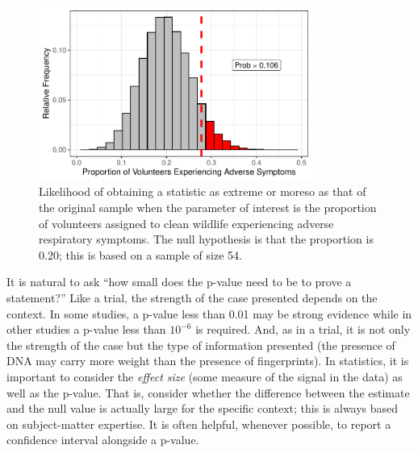 \documentclass[
  letterpaper,
  DIV=11,
  numbers=noendperiod]{scrreprt}
\theoremstyle{plain}
\theoremstyle{definition}
\theoremstyle{definition}
\theoremstyle{remark}
\begin{document}
\begin{figure}

{\centering \includegraphics[width=0.8\textwidth,height=\textheight]{./images/fig-nulldistns-deepwater-pvalue-1.pdf}

}

\caption{\label{fig-nulldistns-deepwater-pvalue}Likelihood of obtaining
a statistic as extreme or moreso as that of the original sample when the
parameter of interest is the proportion of volunteers assigned to clean
wildlife experiencing adverse respiratory symptoms. The null hypothesis
is that the proportion is 0.20; this is based on a sample of size 54.}

\end{figure}

It is natural to ask ``how small does the p-value need to be to prove a
statement?'' Like a trial, the strength of the case presented depends on
the context. In some studies, a p-value less than 0.01 may be strong
evidence while in other studies a p-value less than \(10^{-6}\) is
required. And, as in a trial, it is not only the strength of the case
but the type of information presented (the presence of DNA may carry
more weight than the presence of fingerprints). In statistics, it is
important to consider the \emph{effect size} (some measure of the signal
in the data) as well as the p-value. That is, consider whether the
difference between the estimate and the null value is actually large for
the specific context; this is always based on subject-matter expertise.
It is often helpful, whenever possible, to report a confidence interval
alongside a p-value.
\end{document}
